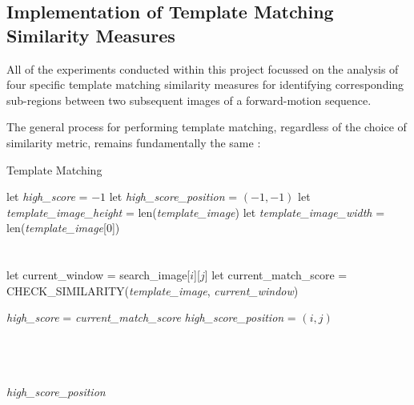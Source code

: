 \subsection{Implementation of Template Matching Similarity Measures}
\label{templmatchopencv}

All of the experiments conducted within this project focussed on the analysis of four specific template matching similarity measures for identifying corresponding sub-regions between two subsequent images of a forward-motion sequence.

The general process for performing template matching, regardless of the choice of similarity metric, remains fundamentally the same \cite{opencvtemplatematching}:

\begin{algorithm}
\caption{Template Matching}
\label{templatematchalgorithm}
\begin{algorithmic}[1]


\State let \textit{high\_score} = $-1$
\State let \textit{high\_score\_position} = $(-1, -1)$ 
\State let \textit{template\_image\_height} = len(\textit{template\_image})
\State let \textit{template\_image\_width} = len(\textit{template\_image}[0])\\\\

 \\

\State let current\_window = search\_image[$i$][$j$]
\State let current\_match\_score = CHECK\_SIMILARITY(\textit{template\_image}, \textit{current\_window}) \\


\State \textit{high\_score} = \textit{current\_match\_score}
\State \textit{high\_score\_position} = $(i, j)$

\EndIf \\

\EndFor
\EndFor \\

\\ \Return \textit{high\_score\_position} \\
\EndProcedure

\end{algorithmic}
\end{algorithm}


